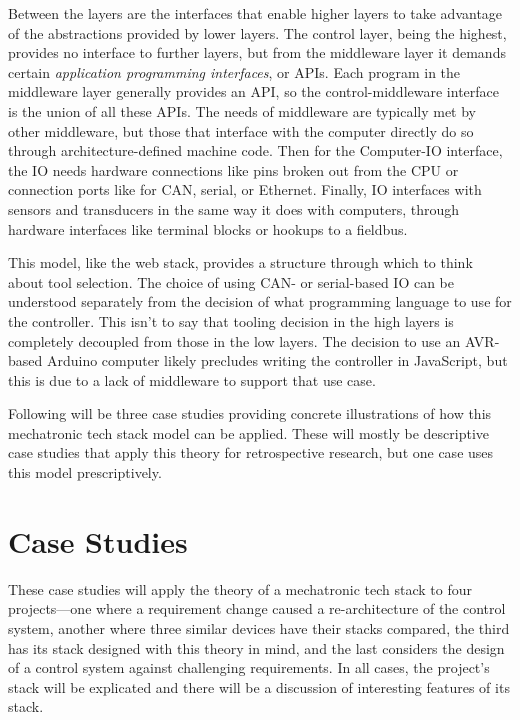 \documentclass[english,12pt,a4paper,pdftex,eng,utf8]{aaltothesis}
\begin{document}
Between the layers are the interfaces that enable higher layers to take advantage of the abstractions provided by lower layers. The control layer, being the highest, provides no interface to further layers, but from the middleware layer it demands certain \textit{application programming interfaces}, or APIs. Each program in the middleware layer generally provides an API, so the control-middleware interface is the union of all these APIs. The needs of middleware are typically met by other middleware, but those that interface with the computer directly do so through architecture-defined machine code. Then for the Computer-IO interface, the IO needs hardware connections like pins broken out from the CPU or connection ports like for CAN, serial, or Ethernet. Finally, IO interfaces with sensors and transducers in the same way it does with computers, through hardware interfaces like terminal blocks or hookups to a fieldbus.

This model, like the web stack, provides a structure through which to think about tool selection. The choice of using CAN- or serial-based IO can be understood separately from the decision of what programming language to use for the controller. This isn't to say that tooling decision in the high layers is completely decoupled from those in the low layers. The decision to use an AVR-based Arduino computer likely precludes writing the controller in JavaScript, but this is due to a lack of middleware to support that use case.

Following will be three case studies providing concrete illustrations of how this mechatronic tech stack model can be applied. These will mostly be descriptive case studies that apply this theory for retrospective research, but one case uses this model prescriptively.

\clearpage


\section{Case Studies}\label{sec:case_studies}

These case studies will apply the theory of a mechatronic tech stack to four projects---one where a requirement change caused a re-architecture of the control system, another where three similar devices have their stacks compared, the third has its stack designed with this theory in mind, and the last considers the design of a control system against challenging requirements. In all cases, the project's stack will be explicated and there will be a discussion of interesting features of its stack.
\end{document}
